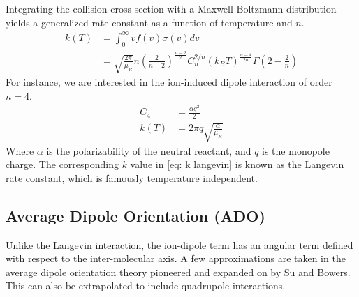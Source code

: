 Integrating the collision cross section with a Maxwell Boltzmann distribution yields a generalized rate constant as a function of temperature and $n$.
\begin{align}
    k(T) & = \int_0^{\infty} v f(v) \sigma(v) dv \label{eq: k int} \\
    & = \sqrt{\frac{2 \pi}{\mu_R}}n\left(\frac{2}{n-2}\right)^{\frac{n-2}{2}}C_n^{2/n}(k_B T)^{\frac{n-4}{2n}}\Gamma\left(2-\frac{2}{n}\right) \label{eq: k(T)}
\end{align}
For instance, we are interested in the ion-induced dipole interaction of order $n=4$.
\begin{align}
	C_4 & = \frac{\alpha q^2}{2} \nonumber \\
	k(T) & = 2\pi q \sqrt{\frac{\alpha}{\mu_R}} \label{eq: k langevin}
\end{align}
Where $\alpha$ is the polarizability of the neutral reactant, and $q$ is the monopole charge. The corresponding $k$ value in \cref{eq: k langevin} is known as the Langevin rate constant, which is famously temperature independent.

\subsection{Average Dipole Orientation (ADO)}

Unlike the Langevin interaction, the ion-dipole term has an angular term defined with respect to the inter-molecular axis. A few approximations are taken in the average dipole orientation theory pioneered and expanded on by Su and Bowers.\cite{Su1973, Su1973a} This can also be extrapolated to include quadrupole interactions.\cite{Su1975}

